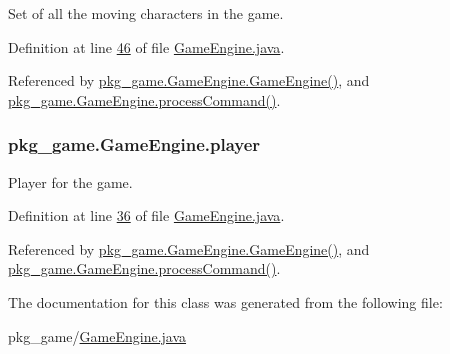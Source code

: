 Set of all the moving characters in the game. 



Definition at line \hyperlink{GameEngine_8java_source_l00046}{46} of file \hyperlink{GameEngine_8java_source}{Game\-Engine.\-java}.



Referenced by \hyperlink{GameEngine_8java_source_l00070}{pkg\-\_\-game.\-Game\-Engine.\-Game\-Engine()}, and \hyperlink{GameEngine_8java_source_l00226}{pkg\-\_\-game.\-Game\-Engine.\-process\-Command()}.

\hypertarget{classpkg__game_1_1GameEngine_a864d14b3375ad026e700ba0c0b9f9d2d}{
\subsubsection[{player}]{ pkg\-\_\-game.\-Game\-Engine.\-player\hspace{0.3cm}{\ttfamily [private]}}}\label{classpkg__game_1_1GameEngine_a864d14b3375ad026e700ba0c0b9f9d2d}


Player for the game. 



Definition at line \hyperlink{GameEngine_8java_source_l00036}{36} of file \hyperlink{GameEngine_8java_source}{Game\-Engine.\-java}.



Referenced by \hyperlink{GameEngine_8java_source_l00070}{pkg\-\_\-game.\-Game\-Engine.\-Game\-Engine()}, and \hyperlink{GameEngine_8java_source_l00226}{pkg\-\_\-game.\-Game\-Engine.\-process\-Command()}.



The documentation for this class was generated from the following file\-:\begin{DoxyCompactItemize}
\item 
pkg\-\_\-game/\hyperlink{GameEngine_8java}{Game\-Engine.\-java}\end{DoxyCompactItemize}
